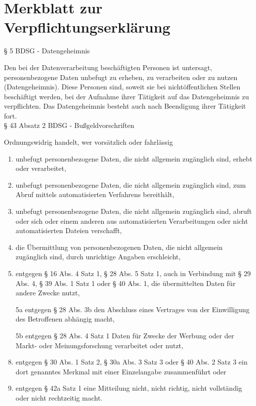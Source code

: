 \documentclass[DIV=12,BCOR=1.5cm]{scrartcl}
\begin{document}
\newpage

\section{Merkblatt zur Verpflichtungserklärung}

§ 5 BDSG - Datengeheimnis

Den bei der Datenverarbeitung beschäftigten Personen ist untersagt, personenbezogene Daten unbefugt zu erheben, zu verarbeiten oder zu nutzen (Datengeheimnis). Diese Personen sind, soweit sie bei nichtöffentlichen Stellen beschäftigt werden, bei der Aufnahme ihrer Tätigkeit auf das Datengeheimnis zu verpflichten. Das Datengeheimnis besteht auch nach Beendigung ihrer Tätigkeit fort.  \\

§ 43 Absatz 2 BDSG  - Bußgeldvorschriften

Ordnungswidrig handelt, wer vorsätzlich oder fahrlässig 
\begin{enumerate}
	\setlength{\itemsep}{-2pt}
	\item unbefugt personenbezogene Daten, die nicht allgemein zugänglich sind, erhebt oder verarbeitet, 
	\item  unbefugt personenbezogene Daten, die nicht allgemein zugänglich sind, zum Abruf mittels automatisierten Verfahrens bereithält, 
	\item  unbefugt personenbezogene Daten, die nicht allgemein zugänglich sind, abruft oder sich oder einem anderen aus automatisierten Verarbeitungen oder nicht automatisierten Dateien verschafft, 
	\item  die Übermittlung von personenbezogenen Daten, die nicht allgemein zugänglich sind, durch unrichtige Angaben erschleicht, 
	\item  entgegen § 16 Abs. 4 Satz 1, § 28 Abs. 5 Satz 1, auch in Verbindung mit § 29 Abs. 4, § 39 Abs. 1 Satz 1 oder § 40 Abs. 1, die übermittelten Daten für andere Zwecke nutzt, 
	\item[5a] entgegen § 28 Abs. 3b den Abschluss eines Vertrages von der Einwilligung des Betroffenen abhängig macht,
	\item[5b]  entgegen § 28 Abs. 4 Satz 1 Daten für Zwecke der Werbung oder der Markt- oder Meinungsforschung verarbeitet oder nutzt,
	\item entgegen § 30 Abs. 1 Satz 2, § 30a Abs. 3 Satz 3 oder § 40 Abs. 2 Satz 3 ein dort genanntes Merkmal mit einer Einzelangabe zusammenführt oder
	\item entgegen § 42a Satz 1 eine Mitteilung nicht, nicht richtig, nicht vollständig oder nicht rechtzeitig macht.
\end{enumerate}
\end{document}
